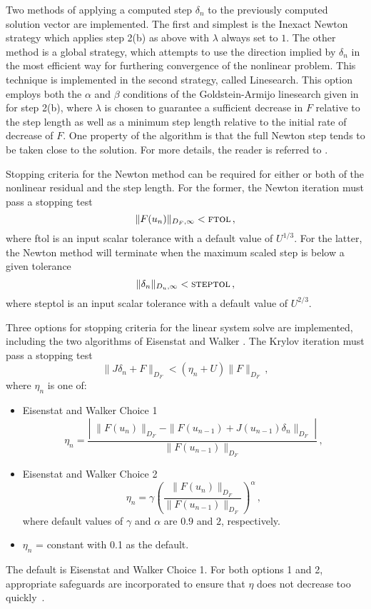 Two methods of applying a computed step $\delta_n$ to the
previously computed solution vector are implemented. The first and
simplest is the Inexact Newton strategy which applies step 2(b) as
above with $\lambda$ always set to $1$. The other method is a
global strategy, which attempts to use the direction implied by
$\delta_n$ in the most efficient way for furthering convergence of
the nonlinear problem. This technique is implemented in the second
strategy, called Linesearch.  This option employs both the
$\alpha$ and $\beta$ conditions of the Goldstein-Armijo linesearch
given in \cite{DeSc:96} for step 2(b), where $\lambda$ is chosen
to guarantee a sufficient decrease in $F$ relative to the step
length as well as a minimum step length relative to the initial
rate of decrease of $F$.  One property of the algorithm is that
the full Newton step tends to be taken close to the solution.  For
more details, the reader is referred to \cite{DeSc:96}.

Stopping criteria for the Newton method can be required for either
or both of the nonlinear residual and the step length.  For the
former, the Newton iteration must pass a stopping test
\[ \|F(u_n)\|_{D_F,\infty} < \mbox{\sc ftol} \, , \]
where {\sc ftol} is an input scalar tolerance with a default value
of $U^{1/3}$. For the latter, the Newton method will terminate
when the maximum scaled step is below a given tolerance
\[ \|\delta_n\|_{D_u,\infty} < \mbox{\sc steptol} \, , \]
where {\sc steptol} is an input scalar tolerance with a default
value of $U^{2/3}$.

Three options for stopping criteria for the linear system solve
are implemented, including the two algorithms of Eisenstat and
Walker \cite{EiWa:96}. The Krylov iteration must pass a stopping
test
\[ \|J \delta_n + F\|_{D_F} < (\eta_n + U) \|F\|_{D_F} \, , \]
where $\eta_n$ is one of:
\begin{itemize}
\item Eisenstat and Walker Choice 1
  \[
  \eta_n = \frac{\left|\; \|F(u_n)\|_{D_F}
      - \|F(u_{n-1}) + J(u_{n-1}) \delta_n \|_{D_F}
      \; \right|}
  {\|F(u_{n-1})\|_{D_F}} \, ,
  \]
\item Eisenstat and Walker Choice 2
  \[
  \eta_n = \gamma
  \left( \frac{ \|F(u_n)\|_{D_F}}{\|F(u_{n-1})\|_{D_F}} \right)^{\alpha} \, ,
  \]
where default values of $\gamma$ and $\alpha$ are $0.9$ and $2$,
 respectively.
\item  $\eta_n$ = constant with 0.1 as the default.
\end{itemize}
The default is Eisenstat and Walker Choice 1. For both options 1
and 2, appropriate safeguards are incorporated to ensure that
$\eta$ does not decrease too quickly~\cite{EiWa:96}.

